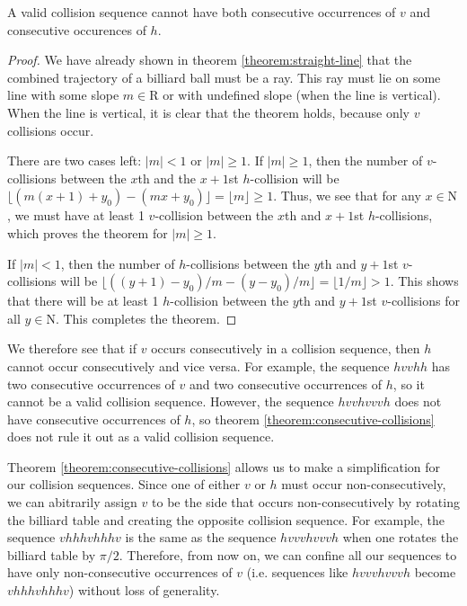\begin{theorem}
  \label{theorem:consecutive-collisions}
  A valid collision sequence cannot have both consecutive occurrences of $v$ and consecutive occurences of $h$.
\end{theorem}
\begin{proof}
  We have already shown in theorem \ref{theorem:straight-line} that the combined trajectory of a billiard ball must be a ray. This ray must lie on some line with some slope $m \in \mathrm{R}$ or with undefined slope (when the line is vertical). When the line is vertical, it is clear that the theorem holds, because only $v$ collisions occur. 

  There are two cases left: $|m| < 1$ or $|m| \geq 1$. If $|m| \geq 1$, then the number of $v$-collisions between the $x$th and the $x+1$st $h$-collision will be $\lfloor (m(x+1) + y_0) - (mx + y_0) \rfloor = \lfloor m \rfloor \geq 1$. Thus, we see that for any $x \in \mathrm{N}$, we must have at least 1 $v$-collision between the $x$th and $x+1$st $h$-collisions, which proves the theorem for $|m| \geq 1$.

  If $|m| < 1$, then the number of $h$-collisions between the $y$th and $y+1$st $v$-collisions will be $\lfloor ((y + 1) - y_0)/m - (y - y_0)/m \rfloor = \lfloor 1/m \rfloor > 1$. This shows that there will be at least 1 $h$-collision between the $y$th and $y+1$st $v$-collisions for all $y \in \mathrm{N}$. This completes the theorem.
\end{proof}

We therefore see that if $v$ occurs consecutively in a collision sequence, then $h$ cannot occur consecutively and vice versa. For example, the sequence $hvvhh$ has two consecutive occurrences of $v$ and two consecutive occurrences of $h$, so it cannot be a valid collision sequence. However, the sequence $hvvhvvvh$ does not have consecutive occurrences of $h$, so theorem \ref{theorem:consecutive-collisions} does not rule it out as a valid collision sequence.

Theorem \ref{theorem:consecutive-collisions} allows us to make a simplification for our collision sequences. Since one of either $v$ or $h$ must occur non-consecutively, we can abitrarily assign $v$ to be the side that occurs non-consecutively by rotating the billiard table and creating the opposite collision sequence. For example, the sequence $vhhhvhhhv$ is the same as the sequence $hvvvhvvvh$ when one rotates the billiard table by $\pi/2$. Therefore, from now on, we can confine all our sequences to have only non-consecutive occurrences of $v$ (i.e. sequences like $hvvvhvvvh$ become $vhhhvhhhv$) without loss of generality.
